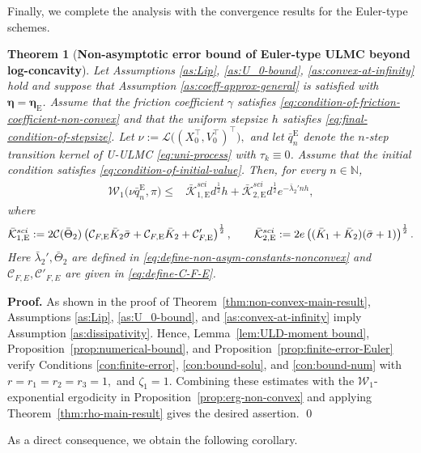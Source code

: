 \documentclass[12pt]{article}
\newenvironment{redtext}
  {\color{black}\ignorespaces}
  {\ignorespacesafterend}
\numberwithin{equation}{section}
\renewenvironment{proof}%
  {\begin{trivlist}%
   \item[]\ignorespaces}%
  {\qed\end{trivlist}}
\newtheorem{thm}{Theorem}[section]
\begin{document}
\begin{redtext}


Finally, we complete the analysis with the convergence results
for the Euler-type schemes.

\begin{thm}[\textbf{Non-asymptotic error bound of Euler-type ULMC beyond log-concavity}]
\label{thm:non-convex-main-result-Euler}
Let Assumptions \ref{as:Lip}, \ref{as:U_0-bound}, 
\ref{as:convex-at-infinity} hold and suppose that Assumption \ref{as:coeff-approx-general} is satisfied with $\boldsymbol{\eta}=\boldsymbol{\eta}_\mathrm{E}$.
Assume that the friction coefficient $\gamma$ satisfies
\eqref{eq:condition-of-friction-coefficient-non-convex} and that
the uniform stepsize $h$ satisfies
\eqref{eq:final-condition-of-stepsize}.
Let
\(
\nu
:=
\mathcal L
\big(
(X_0^\top,V_0^\top)^\top
\big),
\)
and let $\bar q^{\mathrm{E}}_n$ denote the $n$-step transition kernel of U-ULMC \eqref{eq:uni-process} with $\tau_k\equiv0$.
Assume that the initial condition satisfies
\eqref{eq:condition-of-initial-value}.
Then, for every $n\in\mathbb N$,
\begin{align}
\mathcal W_1
\big(
\nu\bar q^{\mathrm{E}}_n,
\pi
\big)
\leq&
\bar{\mathcal K}_{1,\mathrm{E}}^{sci}
d^{\frac12}h
+
\bar{\mathcal K}_{2,\mathrm{E}}^{sci}
d^{\frac12}
e^{-\bar\lambda_2'nh},
\label{eq:non-convex-main-result-Euler}
\end{align}
where
\begin{align}
\bar{\mathcal K}_{1,\mathrm{E}}^{sci}
:={}
2
\mathcal C(\bar\Theta_2)
\left(
\mathcal C_{F,\rm E}\bar K_2\bar\sigma
+
\mathcal C_{F,\rm E}\bar K_2
+
\mathcal C_{F,\rm E}'
\right)^{\frac12},
\qquad
\bar{\mathcal K}_{2,\mathrm{E}}^{sci}
:={}
2e
\left(
(\bar K_1+\bar K_2)
(\bar\sigma+1)
\right)^{\frac12}.
\label{eq:constants-main-result-Euler-sci}
\end{align}
Here $\bar\lambda_2',\bar\Theta_2$ are defined in
\eqref{eq:define-non-asym-constants-nonconvex} and $\mathcal C_{F,E},\mathcal C'_{F,E}$ are given in \eqref{eq:define-C-F-E}.
\end{thm}

\begin{proof}
\textbf{Proof.}
As shown in the proof of
Theorem~\ref{thm:non-convex-main-result},
Assumptions \ref{as:Lip}, \ref{as:U_0-bound}, and
\ref{as:convex-at-infinity} imply Assumption
\ref{as:dissipativity}.
Hence, Lemma~\ref{lem:ULD-moment bound},
Proposition~\ref{prop:numerical-bound}, and
Proposition~\ref{prop:finite-error-Euler} verify
Conditions \ref{con:finite-error}, \ref{con:bound-solu}, and
\ref{con:bound-num}  with
$
r=r_1=r_2=r_3=1,
$ 
and
$
\zeta_1=1
$.
Combining these estimates with the $\mathcal W_1$-exponential
ergodicity in Proposition~\ref{prop:erg-non-convex} and applying
Theorem~\ref{thm:rho-main-result} gives the desired assertion.
\end{proof}
As a direct consequence, we obtain the following corollary.


\end{redtext}
\end{document}
